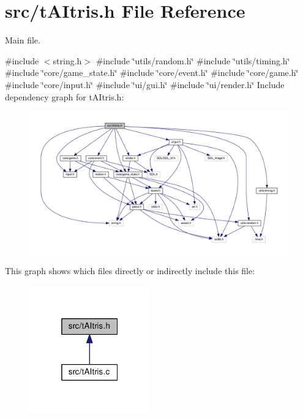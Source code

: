\section{src/t\+A\+Itris.h File Reference}
\label{tAItris_8h}


Main file.  


{\ttfamily \#include $<$string.\+h$>$}\newline
{\ttfamily \#include \char`\"{}utils/random.\+h\char`\"{}}\newline
{\ttfamily \#include \char`\"{}utils/timing.\+h\char`\"{}}\newline
{\ttfamily \#include \char`\"{}core/game\+\_\+state.\+h\char`\"{}}\newline
{\ttfamily \#include \char`\"{}core/event.\+h\char`\"{}}\newline
{\ttfamily \#include \char`\"{}core/game.\+h\char`\"{}}\newline
{\ttfamily \#include \char`\"{}core/input.\+h\char`\"{}}\newline
{\ttfamily \#include \char`\"{}ui/gui.\+h\char`\"{}}\newline
{\ttfamily \#include \char`\"{}ui/render.\+h\char`\"{}}\newline
Include dependency graph for t\+A\+Itris.\+h\+:
\nopagebreak
\begin{figure}[H]
\begin{center}
\leavevmode
\includegraphics[width=350pt]{tAItris_8h__incl}
\end{center}
\end{figure}
This graph shows which files directly or indirectly include this file\+:
\nopagebreak
\begin{figure}[H]
\begin{center}
\leavevmode
\includegraphics[width=148pt]{tAItris_8h__dep__incl}
\end{center}
\end{figure}


